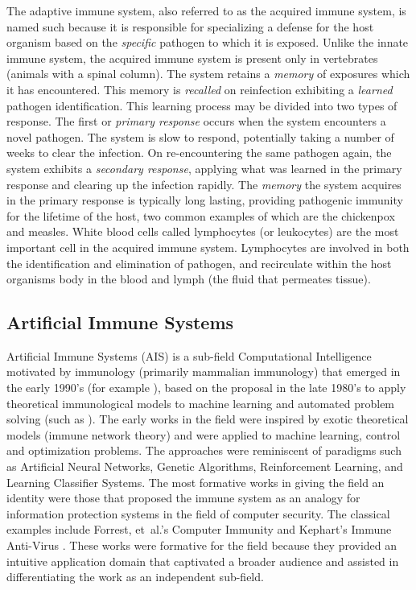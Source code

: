 \begin{bibunit}
The adaptive immune system, also referred to as the acquired immune system, is named such because it is responsible for specializing a defense for the host organism based on the \emph{specific} pathogen to which it is exposed. Unlike the innate immune system, the acquired immune system is present only in vertebrates (animals with a spinal column). The system retains a \emph{memory} of exposures which it has encountered. This memory is \emph{recalled} on reinfection exhibiting a \emph{learned} pathogen identification. This learning process may be divided into two types of response. The first or \emph{primary response} occurs when the system encounters a novel pathogen. The system is slow to respond, potentially taking a number of weeks to clear the infection. On re-encountering the same pathogen again, the system exhibits a \emph{secondary response}, applying what was learned in the primary response and clearing up the infection rapidly. The \emph{memory} the system acquires in the primary response is typically long lasting, providing pathogenic immunity for the lifetime of the host, two common examples of which are the chickenpox and measles. White blood cells called lymphocytes (or leukocytes) are the most important cell in the acquired immune system. Lymphocytes are involved in both the identification and elimination of pathogen, and recirculate within the host organisms body in the blood and lymph (the fluid that permeates tissue). 

\subsection{Artificial Immune Systems}
Artificial Immune Systems (AIS) is a sub-field Computational Intelligence motivated by immunology (primarily mammalian immunology) that emerged in the early 1990's (for example \cite{Bersini1990, Ishida1990}), based on the proposal in the late 1980's to apply theoretical immunological models to machine learning and automated problem solving (such as \cite{Hoffmann1986, Farmer1986}). The early works in the field were inspired by exotic theoretical models (immune network theory) and were applied to machine learning, control and optimization problems. The approaches were reminiscent of paradigms such as Artificial Neural Networks, Genetic Algorithms, Reinforcement Learning, and Learning Classifier Systems. The most formative works in giving the field an identity were those that proposed the immune system as an analogy for information protection systems in the field of computer security. The classical examples include Forrest, et~al.'s Computer Immunity \cite{Forrest1994, Forrest1997a} and Kephart's Immune Anti-Virus \cite{Kephart1994, Kephart1995}. These works were formative for the field because they provided an intuitive application domain that captivated a broader audience and assisted in differentiating the work as an independent sub-field.


\end{bibunit}
